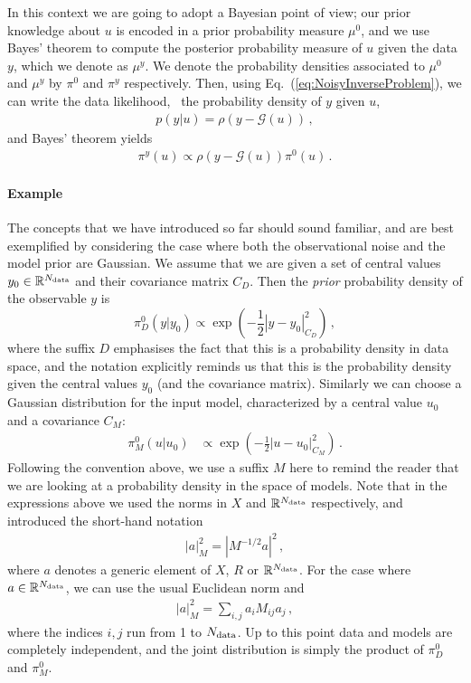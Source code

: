 In this context we are going to adopt a Bayesian point of view; our
prior knowledge about $u$ is encoded in a prior probability measure
$\mu^0$, and we use Bayes' theorem to compute the posterior
probability measure of $u$ given the data $y$, which we denote as
$\mu^y$. We denote the probability densities associated to $\mu^0$ and
$\mu^y$ by $\pi^0$ and $\pi^y$ respectively. Then, using
Eq.~(\ref{eq:NoisyInverseProblem}), we can write the data likelihood,
\ie\ the probability density of $y$ given $u$,
\begin{align}
  \label{eq:YGivenUProbDensity}
  p(y|u) = \rho(y-\mathcal G(u))\, ,
\end{align}
and Bayes' theorem yields
\begin{align}
  \label{eq:BayesThmInversePosterior}
  \pi^y(u) \propto \rho(y-\mathcal G(u)) \pi^0(u)\, .
\end{align}

\paragraph{Example}

The concepts that we have introduced so far should sound familiar, and are best
exemplified by considering the case where both the observational noise and the
model prior are Gaussian. We assume that we are given a set of central values
$y_0 \in \mathbb{R}^{N_{\rm data}}$ and their covariance matrix $C_D$. Then the {\em
prior} probability density of the observable $y$ is 
\begin{equation}
  \label{eq:PriorData}
  \pi_{D}^0(y|y_0) \propto \exp\left(
    -\frac12 \left| y - y_0 \right|_{C_D}^2
    \right)\, ,
\end{equation}
where the suffix $D$ emphasises the fact that this is a probability density in
data space, and the notation explicitly reminds us that this is the probability
density given the central values $y_0$ (and the covariance matrix). Similarly we
can choose a Gaussian distribution for the input model, characterized by a
central value $u_0$ and a covariance $C_M$:
\begin{align}
  \label{eq:PiZeroGauss}
  \pi_{M}^0(u|u_0)  &\propto \exp\left(
              -\frac12 \left| u - u_0 \right|_{C_M}^2
              \right)\, .
\end{align}
Following the convention above, we use a suffix $M$ here to remind the reader
that we are looking at a probability density in the space of models. Note that
in the expressions above we used the norms in $X$ and $\mathbb{R}^{N_{\rm data}}$
respectively, and introduced the short-hand notation
\begin{align}
  \left|a\right|_M^2 = \left| M^{-1/2} a\right|^2\, ,
\end{align}
where $a$ denotes a generic element of $X$, $R$ or $\mathbb{R}^{N_{\rm data}}$. For
the case where $a \in \mathbb{R}^{N_{\rm data}}$, we can use the usual Euclidean norm
and
\begin{align}
  \left| a \right|_M^2 = \sum_{i,j} a_i M_{ij} a_j\, ,
\end{align}
where the indices $i,j$ run from 1 to $N_{\rm data}$.  
Up to this point data and models are completely independent, and the joint
distribution is simply the product of $\pi_{D}^0$ and $\pi_{M}^0$. 

